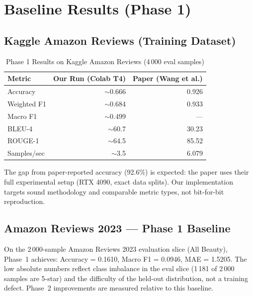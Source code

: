 \documentclass[12pt,a4paper]{article}
\begin{document}
\section{Baseline Results (Phase 1)}

\subsection{Kaggle Amazon Reviews (Training Dataset)}

\begin{table}[H]
\centering
\caption{Phase 1 Results on Kaggle Amazon Reviews (4\,000 eval samples)}
\begin{tabular}{lrr}
\toprule
\textbf{Metric} & \textbf{Our Run (Colab T4)} & \textbf{Paper (Wang et al.)} \\
\midrule
Accuracy      & $\sim$0.666 & 0.926 \\
Weighted F1   & $\sim$0.684 & 0.933 \\
Macro F1      & $\sim$0.499 & --- \\
BLEU-4        & $\sim$60.7  & 30.23 \\
ROUGE-1       & $\sim$64.5  & 85.52 \\
Samples/sec   & $\sim$3.5   & 6.079 \\
\bottomrule
\end{tabular}
\end{table}

\noindent The gap from paper-reported accuracy (92.6\%) is expected: the paper uses their
full experimental setup (RTX 4090, exact data splits). Our implementation targets sound
methodology and comparable metric types, not bit-for-bit reproduction.

\subsection{Amazon Reviews 2023 --- Phase 1 Baseline}

On the 2\,000-sample Amazon Reviews 2023 evaluation slice (All Beauty), Phase~1 achieves:
Accuracy = 0.1610, Macro F1 = 0.0946, MAE = 1.5205. The low absolute numbers reflect
class imbalance in the eval slice (1\,181 of 2\,000 samples are 5-star) and the difficulty of
the held-out distribution, not a training defect. Phase~2 improvements are measured relative
to this baseline.

\end{document}
